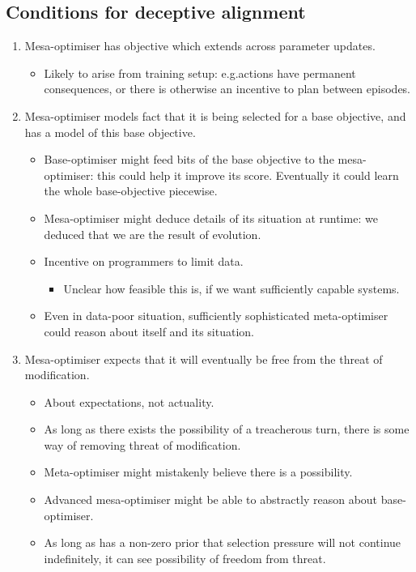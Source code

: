 \subsection{Conditions for deceptive alignment}

\begin{enumerate}[label=\arabic*.]
    \item Mesa-optimiser has objective which extends across parameter updates.
    \begin{itemize}
        \item Likely to arise from training setup: e.g.\@ actions have permanent consequences, or there is otherwise an incentive to plan between episodes.
    \end{itemize}
    \item Mesa-optimiser models fact that it is being selected for a base objective, and has a model of this base objective.
    \begin{itemize}
        \item Base-optimiser might feed bits of the base objective to the mesa-optimiser: this could help it improve its score. Eventually it could learn the whole base-objective piecewise.
        \item Mesa-optimiser might deduce details of its situation at runtime: we deduced that we are the result of evolution.
        \item Incentive on programmers to limit data.
        \begin{itemize}
            \item Unclear how feasible this is, if we want sufficiently capable systems.
        \end{itemize}
        \item Even in data-poor situation, sufficiently sophisticated meta-optimiser could reason about itself and its situation.
    \end{itemize}
    \item Mesa-optimiser expects that it will eventually be free from the threat of modification.
    \begin{itemize}
        \item About expectations, not actuality.
        \item As long as there exists the possibility of a treacherous turn, there is some way of removing threat of modification.
        \item Meta-optimiser might mistakenly believe there is a possibility.
        \item Advanced mesa-optimiser might be able to abstractly reason about base-optimiser.
        \item As long as has a non-zero prior that selection pressure will not continue indefinitely, it can see possibility of freedom from threat.
    \end{itemize}
\end{enumerate}


